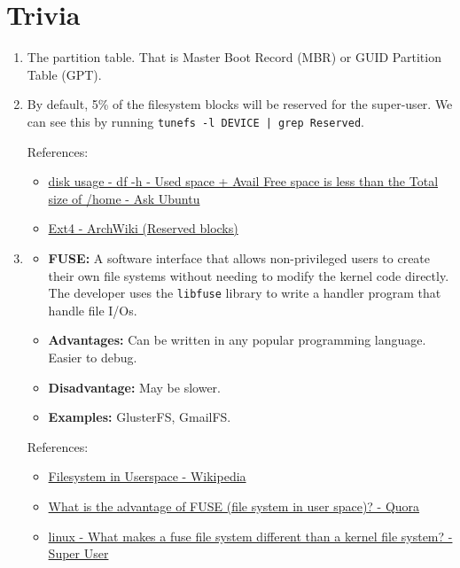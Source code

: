 \documentclass[12pt, a4paper]{article}
\begin{document}
  \section{Trivia}
  \begin{enumerate}[label=(\alph*)]
    \item The partition table. That is Master Boot Record (MBR) or GUID Partition Table (GPT).
    \item By default, 5\% of the filesystem blocks will be reserved for the super-user.
      We can see this by running \texttt{tunefs -l DEVICE | grep Reserved}.

      References:
      \begin{itemize}
        \item \href{https://askubuntu.com/questions/249387/df-h-used-space-avail-free-space-is-less-than-the-total-size-of-home}{disk usage - df -h - Used space + Avail Free space is less than the Total size of /home - Ask Ubuntu}
        \item \href{https://wiki.archlinux.org/title/ext4#Reserved_blocks}{Ext4 - ArchWiki (Reserved blocks)}
      \end{itemize}

    \item
      \begin{itemize}
        \item \textbf{FUSE:} A software interface that allows non-privileged users
          to create their own file systems without needing to modify the kernel
          code directly. The developer uses the \verb|libfuse| library to write
          a handler program that handle file I/Os.
        \item \textbf{Advantages:} Can be written in any popular programming
          language. Easier to debug.
        \item \textbf{Disadvantage:} May be slower.
        \item \textbf{Examples:} GlusterFS, GmailFS.
      \end{itemize}

      References:
      \begin{itemize}
        \item \href{https://en.wikipedia.org/wiki/Filesystem_in_Userspace}{Filesystem in Userspace - Wikipedia}
        \item \href{https://www.quora.com/What-is-the-advantage-of-FUSE-file-system-in-user-space}{What is the advantage of FUSE (file system in user space)? - Quora}
        \item \href{https://superuser.com/questions/312375/what-makes-a-fuse-file-system-different-than-a-kernel-file-system}{linux - What makes a fuse file system different than a kernel file system? - Super User}
      \end{itemize}


\end{enumerate}
\end{document}
